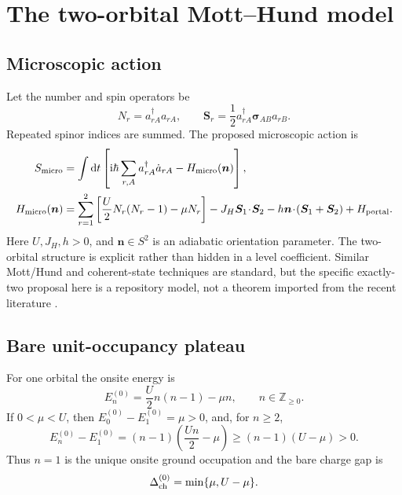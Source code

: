 \documentclass[11pt]{article}
\theoremstyle{definition}
\theoremstyle{remark}
\newcommand{\ii}{\mathrm i}
\newcommand{\dd}{\mathrm d}
\begin{document}
\section{The two-orbital Mott--Hund model}
\subsection{Microscopic action}

Let the number and spin operators be
\begin{equation}
 N_r=a_{rA}^\dagger a_{rA},\qquad
 \bm S_r=\frac12a_{rA}^\dagger\bm\sigma_{AB}a_{rB}.
 \label{eq:number-spin}
\end{equation}
Repeated spinor indices are summed.  The proposed microscopic action is
\begin{align}
 S_{\rm micro}
 &=\int\dd t\left[
  \ii\hbar\sum_{r,A}a_{rA}^\dagger\dot a_{rA}-H_{\rm micro}(\bm n)
 \right],\\
 H_{\rm micro}(\bm n)
 &=\sum_{r=1}^2\left[\frac U2N_r(N_r-1)-\mu N_r\right]
 -J_H\bm S_1\!\cdot\!\bm S_2
 -h\bm n\!\cdot\!(\bm S_1+\bm S_2)+H_{\rm portal}.
 \label{eq:micro-hamiltonian}
\end{align}
Here \(U,J_H,h>0\), and \(\bm n\in S^2\) is an adiabatic orientation
parameter.  The two-orbital structure is explicit rather than hidden in a
level coefficient.  Similar Mott/Hund and coherent-state techniques are
standard, but the specific exactly-two proposal here is a repository model,
not a theorem imported from the recent literature
\cite{ArovasAuerbach1988,OhZhang2023,ZhangEtAl2024Dimer}.

\subsection{Bare unit-occupancy plateau}

For one orbital the onsite energy is
\begin{equation}
 E_n^{(0)}=\frac U2n(n-1)-\mu n,\qquad n\in\mathbb Z_{\ge0}.
\end{equation}
If \(0<\mu<U\), then \(E_0^{(0)}-E_1^{(0)}=\mu>0\), and, for \(n\ge2\),
\begin{equation}
 E_n^{(0)}-E_1^{(0)}
 =(n-1)\left(\frac{Un}{2}-\mu\right)
 \ge(n-1)(U-\mu)>0.
\end{equation}
Thus \(n=1\) is the unique onsite ground occupation and the bare charge gap is
\begin{equation}
 \Delta_{\rm ch}^{(0)}=\min\{\mu,U-\mu\}.
 \label{eq:bare-charge-gap}
\end{equation}
\end{document}
